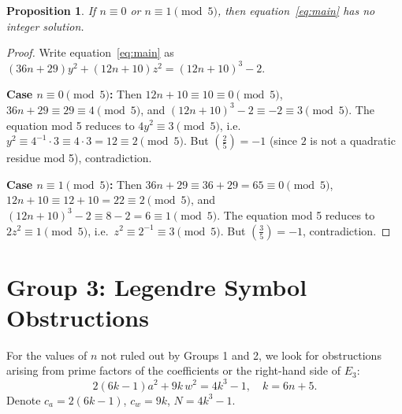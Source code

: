 \documentclass[12pt]{article}
\newtheorem{proposition}[theorem]{Proposition}
\newcommand{\leg}[2]{\left(\frac{#1}{#2}\right)}
\begin{document}
\begin{proposition}\label{prop:group2}
If $n \equiv 0$ or $n \equiv 1 \pmod{5}$, then equation~\eqref{eq:main} has no integer solution.
\end{proposition}
\begin{proof}
Write equation~\eqref{eq:main} as $(36n+29)y^2 + (12n+10)z^2 = (12n+10)^3 - 2$.

\medskip\noindent\textbf{Case $n \equiv 0 \pmod{5}$:}
Then $12n+10 \equiv 10 \equiv 0 \pmod 5$, $36n+29 \equiv 29 \equiv 4 \pmod 5$, 
and $(12n+10)^3-2 \equiv -2 \equiv 3 \pmod 5$.
The equation mod 5 reduces to $4y^2 \equiv 3 \pmod 5$, i.e.\ $y^2 \equiv 4^{-1}\cdot 3 \equiv 4\cdot 3 = 12 \equiv 2 \pmod 5$.
But $\leg{2}{5} = -1$ (since $2$ is not a quadratic residue mod 5), contradiction.

\medskip\noindent\textbf{Case $n \equiv 1 \pmod{5}$:}
Then $36n+29 \equiv 36+29 = 65 \equiv 0 \pmod 5$, $12n+10 \equiv 12+10=22 \equiv 2 \pmod 5$,
and $(12n+10)^3-2 \equiv 8-2 = 6 \equiv 1 \pmod 5$.
The equation mod 5 reduces to $2z^2 \equiv 1 \pmod 5$, i.e.\ $z^2 \equiv 2^{-1} \equiv 3 \pmod 5$.
But $\leg{3}{5} = -1$, contradiction.
\end{proof}

\section{Group 3: Legendre Symbol Obstructions}\label{sec:group3}

For the values of $n$ not ruled out by Groups 1 and 2, we look for obstructions arising from
prime factors of the coefficients or the right-hand side of $E_3$:
\[
2(6k-1)a^2 + 9k\,w^2 = 4k^3-1, \quad k = 6n+5.
\]
Denote $c_a = 2(6k-1)$, $c_w = 9k$, $N = 4k^3-1$.
\end{document}
